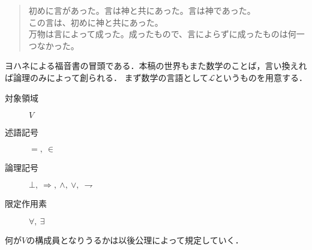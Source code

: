 	\begin{quote}
		初めに言があった。言は神と共にあった。言は神であった。\\
		この言は、初めに神と共にあった。\\
		万物は言によって成った。成ったもので、言によらずに成ったものは何一つなかった。
	\end{quote}
	ヨハネによる福音書の冒頭である．本稿の世界もまた数学のことば，言い換えれば論理のみによって創られる．
	まず数学の言語として$\mathcal{L}$というものを用意する．
	\begin{comment}
	言と書いてことばと読む．なぜ``言葉''ではなく``言''と書くのだろうか．
	一説によれば言葉の葉の字の由来は万葉古今集仮名序にあり，
	現代的に説明すれば，見聞きしたり感動したりしたところを種にして生じる語彙のことを木の葉に喩えているらしい．
	言葉は人が発するものであり，たいていの場合食い違いなく通用する．ならばすなわち，
	葉が付かない``言''とは，人為の介入する前から世界を認識し，人が自覚する前から人の心に通底している
	コードと解釈すれば良いのであろうか．一気に言の字が神格を帯びてくるが，
	``言葉''ではなく``言''と書くことの謎解きとしてはあながち見当はずれでもないらしく，
	上の引用文の通り%
	キリスト教においてことばとは神であり森羅万象を超越しているのである．
	しかもキリスト教に限らずとも，信仰心が薄いと言われる日本でさえ``はじめにことばありき''の文句が闊歩している程，
	それはこの世の真理として2000年以上も国籍や文化を問わず多くの人に受け入れられてきた．
	
		実際に自然言語の発生が事物の観測なしに起こり得たかという問題は言語哲学上も決着がついていないらしいが，
		少なくとも
	
	そして本稿の世界もまた数学のことば，言い換えれば論理のみによって創られるという点でキリスト教的であり，それ以上に
	ことばから始めようというのは，人が生来持っている直観に対して自然な起りなのであろう．
	しかしながら，神なることばが世界の悉くを尽くせる一方で，人が創造する数学の世界は論理のみによっては完結し得ないという事実もある．
	\end{comment}
	
	
	\begin{description}
		\item[対象領域] $V$
		\item[述語記号] $=,\ \in$
		\item[論理記号] $\bot,\ \Longrightarrow,\ \wedge,\ \vee,\ \rightharpoondown$
		\item[限定作用素] $\forall,\ \exists$
	\end{description}
	何が$V$の構成員となりうるかは以後公理によって規定していく．
	
